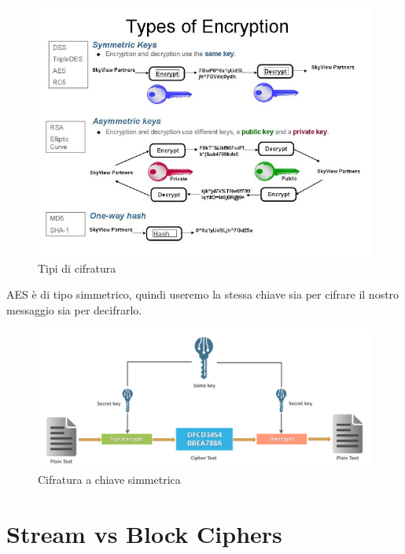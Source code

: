 \begin{figure}[H]
	\centering
	\includegraphics[width=1\textwidth, height=1\textheight, keepaspectratio]{./images/types_of_encryptions/types_of_encryption.png}
	\caption{Tipi di cifratura}
	\label{fig:encryption_types}
\end{figure}

\textsf{\small AES è di tipo simmetrico, quindi useremo la stessa chiave sia per cifrare il nostro messaggio sia per decifrarlo. }

\begin{figure}[H]
	\centering
	\includegraphics[width=1\textwidth, height=1\textheight, keepaspectratio]{./images/types_of_encryptions/symmetric_vs_asymmetric/symmetric-key-what-is-cryptography.png}
	\caption{Cifratura a chiave simmetrica}
	\label{fig:symmetric_encryption}
\end{figure}


\section{Stream vs Block Ciphers}

